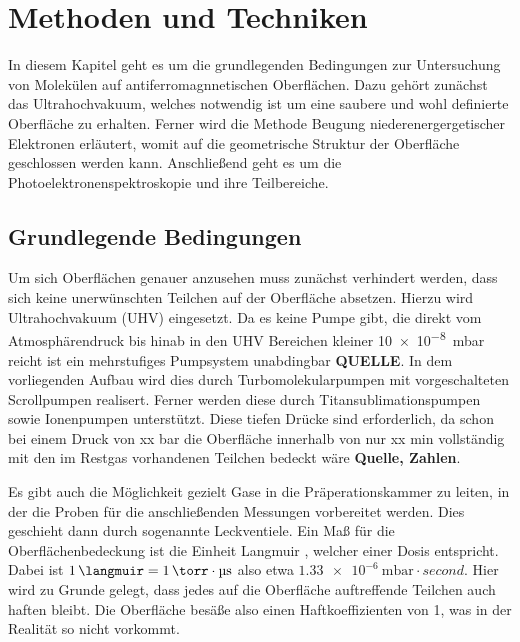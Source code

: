 \chapter{Methoden und Techniken} \label{cha:Methoden}
    In diesem Kapitel geht es um die grundlegenden Bedingungen zur Untersuchung von Molekülen auf antiferromagnnetischen Oberflächen.
    Dazu gehört zunächst das Ultrahochvakuum, welches notwendig ist um eine saubere und wohl definierte Oberfläche zu erhalten.
    Ferner wird die Methode Beugung niederenergergetischer Elektronen erläutert, womit auf die geometrische Struktur der Oberfläche geschlossen werden kann.
    Anschließend geht es um die Photoelektronenspektroskopie und ihre Teilbereiche.

    \section{Grundlegende Bedingungen} \label{sec:Grundlagen}
    Um sich Oberflächen genauer anzusehen muss zunächst verhindert werden, dass sich keine unerwünschten Teilchen auf der Oberfläche absetzen.
    Hierzu wird Ultrahochvakuum (UHV) eingesetzt.
    Da es keine Pumpe gibt, die direkt vom Atmosphärendruck bis hinab in den UHV Bereichen kleiner \SI{10e-8}{\milli\bar} reicht ist ein mehrstufiges Pumpsystem unabdingbar \textbf{QUELLE}.
    In dem vorliegenden Aufbau wird dies durch Turbomolekularpumpen mit vorgeschalteten Scrollpumpen realisert.
    Ferner werden diese durch Titansublimationspumpen sowie Ionenpumpen unterstützt.
    Diese tiefen Drücke sind erforderlich, da schon bei einem Druck von xx bar die Oberfläche innerhalb von nur xx min vollständig mit den im Restgas vorhandenen Teilchen bedeckt wäre \textbf{Quelle, Zahlen}.

    Es gibt auch die Möglichkeit gezielt Gase in die Präperationskammer zu leiten, in der die Proben für die anschließenden Messungen vorbereitet werden.
    Dies geschieht dann durch sogenannte Leckventiele.
    Ein Maß für die Oberflächenbedeckung ist die Einheit Langmuir \si{\langmuir}, welcher einer Dosis entspricht.
    Dabei ist $\SI{1}{\langmuir} = \SI{1}{\torr} \cdot \si{\micro\second}$ also etwa $\SI{1.33e-6}{\milli\bar} \cdot \si{second}$.
    Hier wird zu Grunde gelegt, dass jedes auf die Oberfläche auftreffende Teilchen auch haften bleibt. 
    Die Oberfläche besäße also einen Haftkoeffizienten von \num{1}, was in der Realität so nicht vorkommt.

